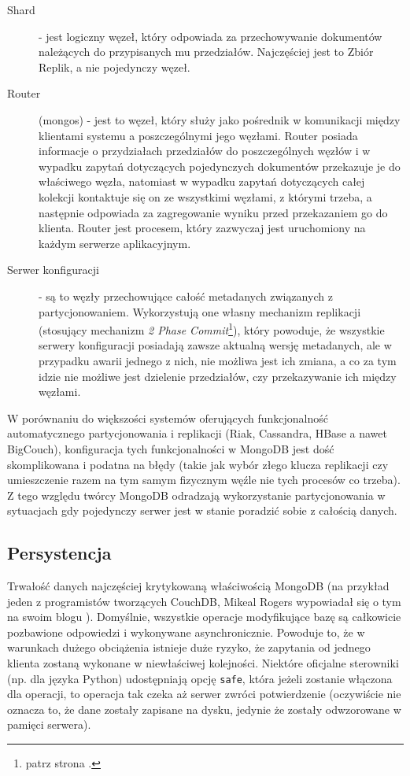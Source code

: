\begin{description}
 \item[Shard] - jest logiczny węzeł, który odpowiada za przechowywanie dokumentów należących do przypisanych mu przedziałów.
 Najczęściej jest to Zbiór Replik, a nie pojedynczy węzeł.
 \item[Router] (mongos) - jest to węzeł, który służy jako pośrednik w komunikacji między klientami systemu a poszczególnymi jego węzłami.
 Router posiada informacje o przydziałach przedziałów do poszczególnych węzłów i w wypadku zapytań dotyczących pojedynczych dokumentów przekazuje je do właściwego węzła, natomiast w wypadku zapytań dotyczących całej kolekcji kontaktuje się on ze wszystkimi węzłami, z którymi trzeba, a następnie odpowiada za zagregowanie wyniku przed przekazaniem go do klienta.
 Router jest procesem, który zazwyczaj jest uruchomiony na każdym serwerze aplikacyjnym.
 \item[Serwer konfiguracji] - są to węzły przechowujące całość metadanych związanych z partycjonowaniem.
 Wykorzystują one własny mechanizm replikacji (stosujący mechanizm \emph{2 Phase Commit}\footnote{patrz strona \pageref{sec:2-phase-commit}.}), który powoduje, że wszystkie serwery konfiguracji posiadają zawsze aktualną wersję metadanych, ale w przypadku awarii jednego z nich, nie możliwa jest ich zmiana, a co za tym idzie nie możliwe jest dzielenie przedziałów, czy przekazywanie ich między węzłami.
\end{description}

W porównaniu do większości systemów oferujących funkcjonalność automatycznego partycjonowania i replikacji (Riak, Cassandra, HBase a nawet BigCouch), konfiguracja tych funkcjonalności w MongoDB jest dość skomplikowana i podatna na błędy (takie jak wybór złego klucza replikacji czy umieszczenie razem na tym samym fizycznym węźle nie tych procesów co trzeba).
Z tego względu twórcy MongoDB odradzają wykorzystanie partycjonowania w sytuacjach gdy pojedynczy serwer jest w stanie poradzić sobie z całością danych.

\subsection*{Persystencja}

Trwałość danych najczęściej krytykowaną właściwością MongoDB (na przykład jeden z programistów tworzących CouchDB, Mikeal Rogers wypowiadał się o tym na swoim blogu \cite{mongodb-durability}).
Domyślnie, wszystkie operacje modyfikujące bazę są całkowicie pozbawione odpowiedzi i wykonywane asynchronicznie.
Powoduje to, że w warunkach dużego obciążenia istnieje duże ryzyko, że zapytania od jednego klienta zostaną wykonane w niewłaściwej kolejności.
Niektóre oficjalne sterowniki (np. dla języka Python) udostępniają opcję \verb+safe+, która jeżeli zostanie włączona dla operacji, to operacja tak czeka aż serwer zwróci potwierdzenie (oczywiście nie oznacza to, że dane zostały zapisane na dysku, jedynie że zostały odwzorowane w pamięci serwera).


